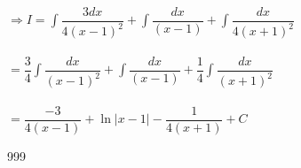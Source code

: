 \documentclass[a4paper]{article}
\begin{document}
$\Rightarrow I = \displaystyle\int \dfrac{3dx}{4(x-1)^2} + \displaystyle\int \dfrac{dx}{(x-1)} + \displaystyle\int \dfrac{dx}{4(x+1)^2} $\\\\

$= \dfrac{3}{4} \displaystyle\int\dfrac{dx}{(x-1)^2} + \displaystyle\int \dfrac{dx}{(x-1)} + \dfrac{1}{4} \displaystyle\int \dfrac{dx}{(x+1)^2}$\\\\

$= \dfrac{-3}{4(x-1)} + \ln|x-1| - \dfrac{1}{4(x+1)} + C$

\begin{thebibliography}{999}
\end{thebibliography}
\end{document}

